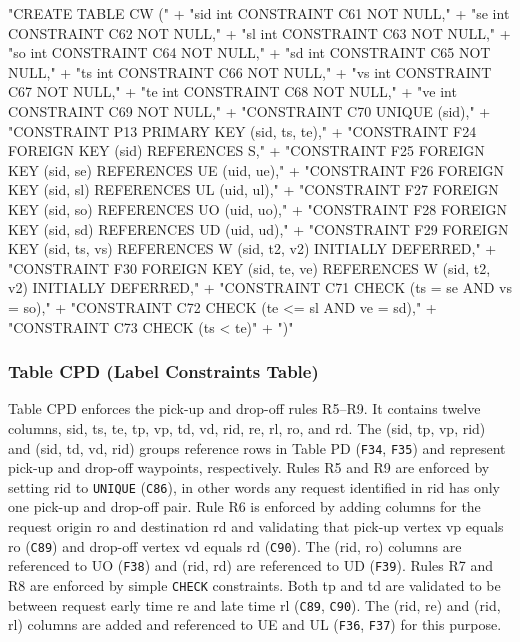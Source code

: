 \documentclass{article}
\def\nwendcode{\endtrivlist \endgroup}
\let\nwdocspar=\par
\theoremstyle{definition}
\begin{document}
\nwenddocs{}\endmoddef{}
"CREATE TABLE CW ("
  + "sid int  CONSTRAINT C61 NOT NULL,"
  + "se  int  CONSTRAINT C62 NOT NULL,"
  + "sl  int  CONSTRAINT C63 NOT NULL,"
  + "so  int  CONSTRAINT C64 NOT NULL,"
  + "sd  int  CONSTRAINT C65 NOT NULL,"
  + "ts  int  CONSTRAINT C66 NOT NULL,"
  + "vs  int  CONSTRAINT C67 NOT NULL,"
  + "te  int  CONSTRAINT C68 NOT NULL,"
  + "ve  int  CONSTRAINT C69 NOT NULL,"
  + "CONSTRAINT C70 UNIQUE (sid),"
  + "CONSTRAINT P13 PRIMARY KEY (sid, ts, te),"
  + "CONSTRAINT F24 FOREIGN KEY (sid) REFERENCES S,"
  + "CONSTRAINT F25 FOREIGN KEY (sid, se) REFERENCES UE (uid, ue),"
  + "CONSTRAINT F26 FOREIGN KEY (sid, sl) REFERENCES UL (uid, ul),"
  + "CONSTRAINT F27 FOREIGN KEY (sid, so) REFERENCES UO (uid, uo),"
  + "CONSTRAINT F28 FOREIGN KEY (sid, sd) REFERENCES UD (uid, ud),"
  + "CONSTRAINT F29 FOREIGN KEY (sid, ts, vs) REFERENCES W (sid, t2, v2) INITIALLY DEFERRED,"
  + "CONSTRAINT F30 FOREIGN KEY (sid, te, ve) REFERENCES W (sid, t2, v2) INITIALLY DEFERRED,"
  + "CONSTRAINT C71 CHECK (ts = se AND vs = so),"
  + "CONSTRAINT C72 CHECK (te <= sl AND ve = sd),"
  + "CONSTRAINT C73 CHECK (ts < te)"
  + ")"
\nwendcode{}\nwdocspar

\subsubsection{Table CPD (Label Constraints Table)}
Table CPD enforces the pick-up and drop-off rules R5--R9. It contains twelve
columns, \textsf{sid}, \textsf{ts}, \textsf{te}, \textsf{tp}, \textsf{vp},
\textsf{td}, \textsf{vd}, \textsf{rid}, \textsf{re}, \textsf{rl}, \textsf{ro},
and \textsf{rd}.  The (\textsf{sid}, \textsf{tp}, \textsf{vp}, \textsf{rid})
and (\textsf{sid}, \textsf{td}, \textsf{vd}, \textsf{rid}) groups reference
rows in Table PD ({\tt{}F34}, {\tt{}F35}) and represent pick-up and drop-off
waypoints, respectively.  Rules R5 and R9 are enforced by setting \textsf{rid}
to \texttt{UNIQUE} ({\tt{}C86}), in other words any request identified in
\textsf{rid} has only one pick-up and drop-off pair.  Rule R6 is enforced by
adding columns for the request origin \textsf{ro} and destination \textsf{rd}
and validating that pick-up vertex \textsf{vp} equals \textsf{ro} ({\tt{}C89}) and
drop-off vertex \textsf{vd} equals \textsf{rd} ({\tt{}C90}). The (\textsf{rid},
\textsf{ro}) columns are referenced to UO ({\tt{}F38}) and (\textsf{rid},
\textsf{rd}) are referenced to UD ({\tt{}F39}).  Rules R7 and R8 are enforced by
simple \texttt{CHECK} constraints. Both \textsf{tp} and \textsf{td} are
validated to be between request early time \textsf{re} and late time
\textsf{rl} ({\tt{}C89}, {\tt{}C90}). The (\textsf{rid}, \textsf{re}) and
(\textsf{rid}, \textsf{rl}) columns are added and referenced to UE and UL
({\tt{}F36}, {\tt{}F37}) for this purpose.
\end{document}
